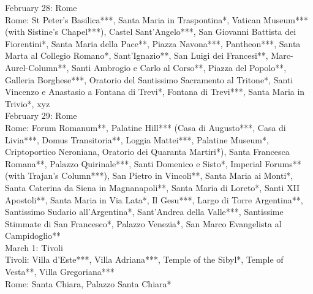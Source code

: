 February 28: Rome\\%

Rome: St Peter's Basilica***, Santa Maria in Traspontina*, Vatican Museum*** (with Sistine's Chapel***), Castel Sant'Angelo***, San Giovanni Battista dei Fiorentini*, Santa Maria della Pace**, Piazza Navona***, Pantheon***, Santa Marta al Collegio Romano*, Sant'Ignazio**, San Luigi dei Francesi**, Marc-Aurel-Column**, Santi Ambrogio e Carlo al Corso**, Piazza del Popolo**, Galleria Borghese***, Oratorio del Santissimo Sacramento al Tritone*, Santi Vincenzo e Anastasio a Fontana di Trevi*, Fontana di Trevi***, Santa Maria in Trivio*, xyz\\%

February 29: Rome\\%

Rome: Forum Romanum**, Palatine Hill*** (Casa di Augusto***, Casa di Livia***, Domus Transitoria**, Loggia Mattei***, Palatine Museum*, Criptoportico Neroniana, Oratorio dei Quaranta Martiri*), Santa Francesca Romana**, Palazzo Quirinale***, Santi Domenico e Sisto*, Imperial Forums** (with Trajan's Column***), San Pietro in Vincoli**, Santa Maria ai Monti*, Santa Caterina da Siena in Magnanapoli**, Santa Maria di Loreto*, Santi XII Apostoli**, Santa Maria in Via Lata*, Il Gesu***, Largo di Torre Argentina**, Santissimo Sudario all'Argentina*, Sant'Andrea della Valle***, Santissime Stimmate di San Francesco*, Palazzo Venezia*, San Marco Evangelista al Campidoglio**\\%

March 1: Tivoli\\

Tivoli: Villa d'Este***, Villa Adriana***, Temple of the Sibyl*, Temple of Vesta**, Villa Gregoriana***\\%
Rome: Santa Chiara, Palazzo Santa Chiara*\\%

